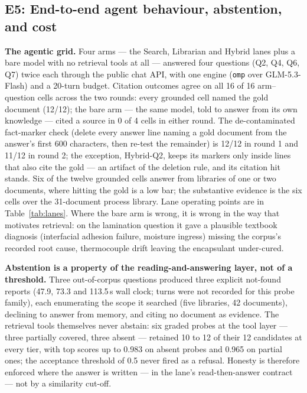 
\subsection{E5: End-to-end agent behaviour, abstention, and cost}
\label{sec:e5}
\label{sec:agentic}\label{sec:abstention}\label{sec:composition}\label{sec:eval-agent}

\textbf{The agentic grid.}
Four arms --- the Search, Librarian and Hybrid lanes plus a bare model with
no retrieval tools at all --- answered four questions (Q2, Q4, Q6, Q7)
twice each through the public chat API, with one engine (\texttt{omp} over
GLM-5.3-Flash) and a 20-turn budget. Citation outcomes agree on all 16 of
16 arm--question cells across the two rounds: every grounded cell named
the gold document (12/12); the bare arm --- the same model, told to answer
from its own knowledge --- cited a source in 0 of 4 cells in either round.
The de-contaminated fact-marker check (delete every answer line naming a
gold document from the answer's first 600 characters, then re-test the
remainder) is 12/12 in round 1 and 11/12 in round 2; the exception,
Hybrid-Q2, keeps its markers only inside lines that also cite the gold ---
an artifact of the deletion rule, and its citation hit stands. Six of the
twelve grounded cells answer from libraries of one or two documents, where
hitting the gold is a low bar; the substantive evidence is the six cells
over the 31-document process library. Lane operating points are in
Table~\ref{tab:lanes}. Where the bare arm is wrong, it is wrong in the way
that motivates retrieval: on the lamination question it gave a plausible
textbook diagnosis (interfacial adhesion failure, moisture ingress)
missing the corpus's recorded root cause, thermocouple drift leaving the
encapsulant under-cured.

\textbf{Abstention is a property of the reading-and-answering layer, not of
a threshold.}
Three out-of-corpus questions produced three explicit not-found reports
(47.9, 73.3 and 113.5\,s wall clock; turns were not recorded for this
probe family), each enumerating the scope it searched (five libraries, 42
documents), declining to answer from memory, and citing no document as
evidence. The retrieval tools themselves never abstain: six graded probes
at the tool layer --- three partially covered, three absent --- retained
10 to 12 of their 12 candidates at every tier, with top scores up to
0.983 on absent probes and 0.965 on partial ones; the acceptance
threshold of 0.5 never fired as a refusal. Honesty is therefore enforced
where the answer is written --- in the lane's read-then-answer contract
\cite{selfrag,feng-abstain,yin-knowwhat} --- not by a similarity cut-off.

